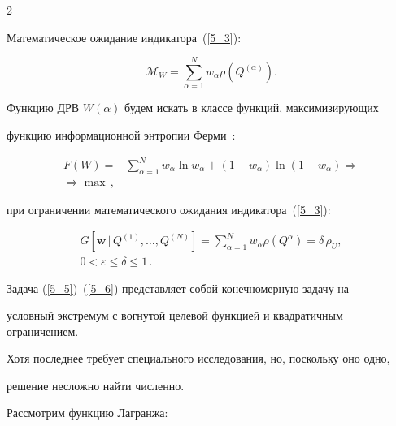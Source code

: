 \begin{multicols}{2}
\begin{equation*}
\end{equation*}


Математическое ожидание индикатора~(\ref{5_3}):


\begin{equation*}




\mathcal{M}_{W} = \sum\limits^N_{\alpha=1} w_{\alpha} \rho(Q^{(\alpha)}).


\end{equation*}


Функцию ДРВ $W(\alpha)$ будем искать в классе функций, максимизирующих 


функцию информационной энтропии Ферми~\cite{Popkov_1995}:


\begin{multline}


\label{5_5}


\!\!F(W) = - \sum\limits^N_{\alpha=1} w_{\alpha} \ln w_{\alpha} + (1 - 


w_{\alpha})\ln(1 - w_{\alpha}) \Rightarrow{}\\


{}\Rightarrow \max\,,


\end{multline}


при ограничении математического ожидания индикатора~(\ref{5_3}):


\begin{multline}


\label{5_6}


G[\mathbf{w}\,|\,Q^{(1)}, \dots, Q^{(N)}] = \sum\limits^N_{\alpha=1} 


w_{\alpha} \rho(Q^{\alpha}) = \delta\,\rho_U,\\


 0 < \varepsilon \le 


\delta \le 1\,.


\end{multline}


Задача (\ref{5_5})--(\ref{5_6}) представляет собой конечномерную задачу на 


условный экстремум с вогнутой целевой функцией и квадратичным ограничением. 


Хотя последнее требует специального исследования, но, поскольку оно одно, 


решение несложно найти чис\-ленно.





Рассмотрим функцию Лагранжа:



\end{multicols}
